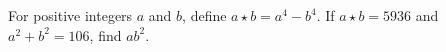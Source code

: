 For positive integers $a$ and $b$, define $a\star b=a^4-b^4$. If $a\star b=5936$ and $a^2+b^2=106$, find $ab^2$.
